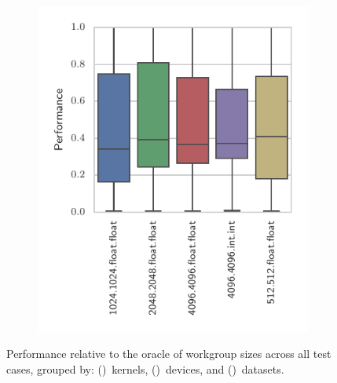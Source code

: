 \documentclass[nonatbib,preprint,9pt]{sigplanconf}
\begin{document}
\begin{figure}
\begin{subfigure}[h]{.48\columnwidth}
    \vspace{-1.5em} %
    \caption{}
    \label{fig:performance-devices}
  \end{subfigure}
  ~%
  \begin{subfigure}[h]{.48\columnwidth}
    \centering
    \includegraphics[width=\columnwidth]{img/performance_datasets.pdf}
    \vspace{-1.5em} %
    \caption{}
    \label{fig:performance-datasets}
  \end{subfigure}
  \caption[Workgroup size performances across device, kernel, and dataset]{%
    Performance relative to the oracle of workgroup sizes across all
    test cases, grouped by: ()~kernels,
    ()~devices, and
    ()~datasets.%
  }
  \label{fig:performances}
\end{figure}


\end{document}
